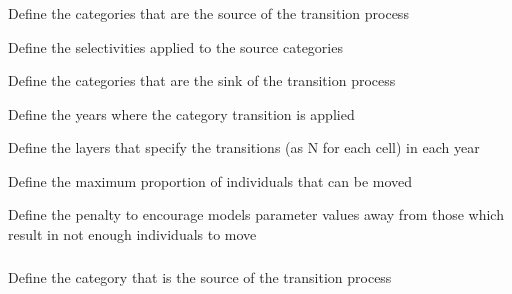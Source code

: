 \subsubsection[Category transition process]{}

 {Define the categories that are the source of the transition process}

 {Define the selectivities applied to the source categories}

 {Define the categories that are the sink of the transition process}

 {Define the years where the category transition is applied}

 {Define the layers that specify the transitions (as N for each cell) in each year}

 {Define the maximum proportion of individuals that can be moved}

 {Define the penalty to encourage models parameter values away from those which result in not enough individuals to move}

\subsubsection[Category transition rate process]{}

 {Define the category that is the source of the transition process}


